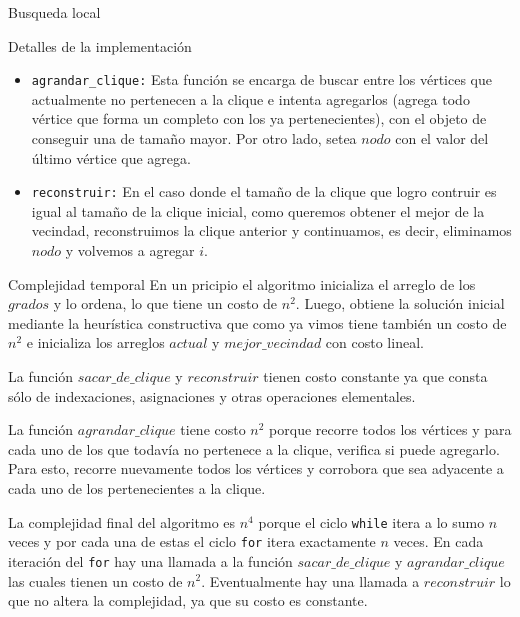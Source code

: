 \begin{section}{Busqueda local}
\begin{subsection}{Detalles de la implementación}
\begin{itemize}
			\item \texttt{agrandar\_clique:} Esta función se encarga de buscar entre los vértices que actualmente no pertenecen a la clique e intenta agregarlos (agrega todo vértice que forma un completo con los ya pertenecientes), con el objeto de conseguir una de tamaño mayor. Por otro lado, setea $nodo$ con el valor del último vértice que agrega.

			\item \texttt{reconstruir:} En el caso donde el tamaño de la clique que logro contruir es igual al tamaño de la clique inicial, como queremos obtener el mejor de la vecindad, reconstruimos la clique anterior y continuamos, es decir, eliminamos $nodo$ y volvemos a agregar $i$.
		\end{itemize}
		\end{subsection}
		\begin{subsection}{Complejidad temporal}
			En un pricipio el algoritmo inicializa el arreglo de los $grados$ y lo ordena, lo que tiene un costo de $n^2$. Luego, obtiene la solución inicial mediante la heurística constructiva que como ya vimos tiene también un costo de $n^2$ e inicializa los arreglos $actual$ y $mejor\_vecindad$ con costo lineal.

			La función $sacar\_de\_clique$ y $reconstruir$ tienen costo constante ya que consta sólo de indexaciones, asignaciones y otras operaciones elementales.

			La función $agrandar\_clique$ tiene costo $n^2$ porque recorre todos los vértices y para cada uno de los que todavía no pertenece a la clique, verifica si puede agregarlo. Para esto, recorre nuevamente todos los vértices y corrobora que sea adyacente a cada uno de los pertenecientes a la clique.

			La complejidad final del algoritmo es $n^4$ porque el ciclo \texttt{while} itera a lo sumo $n$ veces y por cada una de estas el ciclo \texttt{for} itera exactamente $n$ veces. En cada iteración del \texttt{for} hay una llamada a la función $sacar\_de\_clique$ y $agrandar\_clique$ las cuales tienen un costo de $n^2$. Eventualmente hay una llamada a $reconstruir$ lo que no altera la complejidad, ya que su costo es constante.
		\end{subsection}
\end{section}

